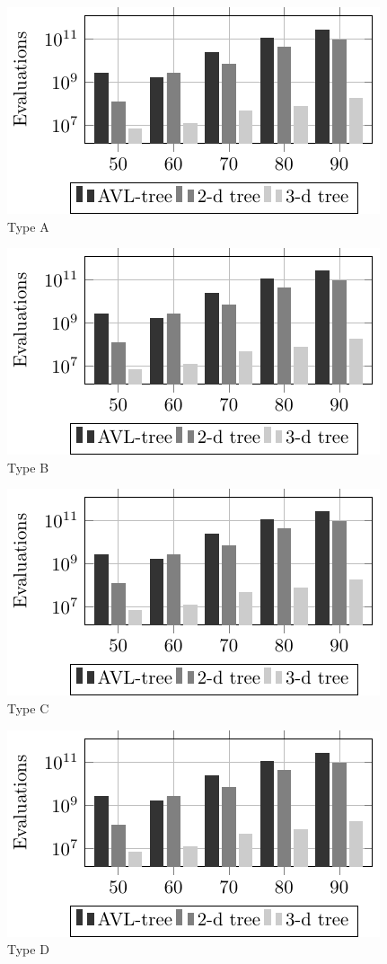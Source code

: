 \centering
\begin{subfigure}{.5\textwidth}
  \centering
  \includegraphics[scale=0.6]{tab/cmp/3dimA}
  \caption{Type A}
  \label{fig:sub5}
\end{subfigure}%
\begin{subfigure}{.5\textwidth}
  \centering
  \includegraphics[scale=0.6]{tab/cmp/3dimA}
  \caption{Type B}
  \label{fig:sub6}
\end{subfigure}
\begin{subfigure}{.49\textwidth}
  \centering
  \includegraphics[scale=0.6]{tab/cmp/3dimA}
  \caption{Type C}
  \label{fig:sub7}
\end{subfigure}
\begin{subfigure}{.49\textwidth}
  \centering
  \includegraphics[scale=0.6]{tab/cmp/3dimA}
  \caption{Type D}
  \label{fig:sub8}
\end{subfigure}
